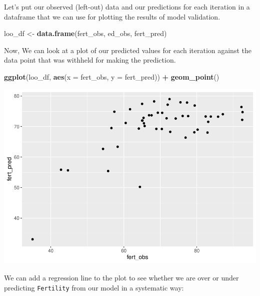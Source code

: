 \documentclass[
]{book}
\newenvironment{Shaded}{\begin{snugshade}}{\end{snugshade}}
\newcommand{\DataTypeTok}[1]{\textcolor[rgb]{0.13,0.29,0.53}{#1}}
\newcommand{\KeywordTok}[1]{\textcolor[rgb]{0.13,0.29,0.53}{\textbf{#1}}}
\newcommand{\NormalTok}[1]{#1}
\newcommand{\OperatorTok}[1]{\textcolor[rgb]{0.81,0.36,0.00}{\textbf{#1}}}
\newcommand{\StringTok}[1]{\textcolor[rgb]{0.31,0.60,0.02}{#1}}
\begin{document}
Let's put our observed (left-out) data and our predictions for each iteration in a dataframe that we can use for plotting the results of model validation.

\begin{Shaded}
\begin{Highlighting}[]
\NormalTok{loo_df <-}\StringTok{ }\KeywordTok{data.frame}\NormalTok{(fert_obs, ed_obs, fert_pred)}
\end{Highlighting}
\end{Shaded}

Now, We can look at a plot of our predicted values for each iteration against the data point that was withheld for making the prediction.

\begin{Shaded}
\begin{Highlighting}[]
\KeywordTok{ggplot}\NormalTok{(loo_df, }\KeywordTok{aes}\NormalTok{(}\DataTypeTok{x =}\NormalTok{ fert_obs, }\DataTypeTok{y =}\NormalTok{ fert_pred)) }\OperatorTok{+}
\StringTok{  }\KeywordTok{geom_point}\NormalTok{()}
\end{Highlighting}
\end{Shaded}

\includegraphics{worstr_files/figure-latex/unnamed-chunk-314-1.pdf}

We can add a regression line to the plot to see whether we are over or under predicting \texttt{Fertility} from our model in a systematic way:
\end{document}
